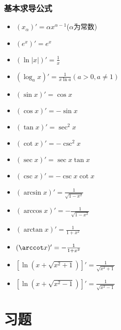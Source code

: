 \subsubsection{基本求导公式}
\begin{multicols}{2}
    \begin{itemize}
        \item $ (x_{\alpha})'=\alpha x^{\alpha-1} $($ \alpha $为常数)
        \item $ (e^{x})'=e^{x} $
        \item $ (\ln |x|)'=\frac{1}{x} $
        \item $ (\log_{a}x)'=\frac{1}{x\ln a}(a>0,a\neq 1) $
        \item $ (\sin x)'=\cos x $
        \item $ (\cos x)'=-\sin x $
        \item $ (\tan x)'=\sec^{2}x $
        \item $ (\cot x)'=-\csc^{2}x $
        \item $ (\sec x)'=\sec x\tan x $
        \item $ (\csc x)'=-\csc x\cot x $
        \item $ (\arcsin x)'=\frac{1}{\sqrt{1-x^{2}}} $
        \item $ (\arccos x)'=-\frac{1}{\sqrt{1-x^{2}}} $
        \item $ (\arctan x)'=\frac{1}{1+x^{2}} $
        \item $ (\arccot x)'=-\frac{1}{1+x^{2}} $
        \item $ [\ln(x+\sqrt{x^{2}+1})]'=\frac{1}{\sqrt{x^{2}+1}} $
        \item $ [\ln (x+\sqrt{x^{2}-1})]'=\frac{1}{\sqrt{x^{2}-1}} $
    \end{itemize}
\end{multicols}
\section{习题}
